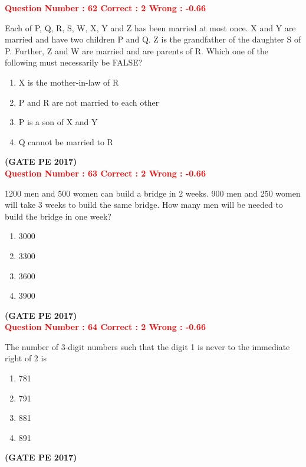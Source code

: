 \documentclass[journal,12pt,onecolumn]{article}
\begin{document}
{\textcolor{red}{\textbf{Question Number : 62 \hfill Correct : 2  Wrong : -0.66}}


Each of P, Q, R, S, W, X, Y and Z has been married at most once. X and Y are married and have two children P and Q. Z is the grandfather of the daughter S of P. Further, Z and W are married and are parents of R. Which one of the following must necessarily be FALSE?

\begin{enumerate}[label=(\Alph*)]
    \item X is the mother-in-law of R
    \item P and R are not married to each other
    \item P is a son of X and Y
    \item Q cannot be married to R
\end{enumerate}

\hfill\textbf{(GATE PE 2017)}\\[0.6cm]


\textcolor{red}{\textbf{Question Number : 63 \hfill Correct : 2  Wrong : -0.66}}

1200 men and 500 women can build a bridge in 2 weeks. 900 men and 250 women will take 3 weeks to build the same bridge. How many men will be needed to build the bridge in one week?

\begin{enumerate}[label=(\Alph*)]
    \item 3000
    \item 3300
    \item 3600
    \item 3900
\end{enumerate}

\hfill\textbf{(GATE PE 2017)}\\[0.6cm]


\textcolor{red}{\textbf{Question Number : 64 \hfill Correct : 2  Wrong : -0.66}}


The number of 3-digit numbers such that the digit 1 is never to the immediate right of 2 is

\begin{enumerate}[label=(\Alph*)]
    \item 781
    \item 791
    \item 881
    \item 891
\end{enumerate}

\hfill\textbf{(GATE PE 2017)}\\[0.6cm]

}
\end{document}
